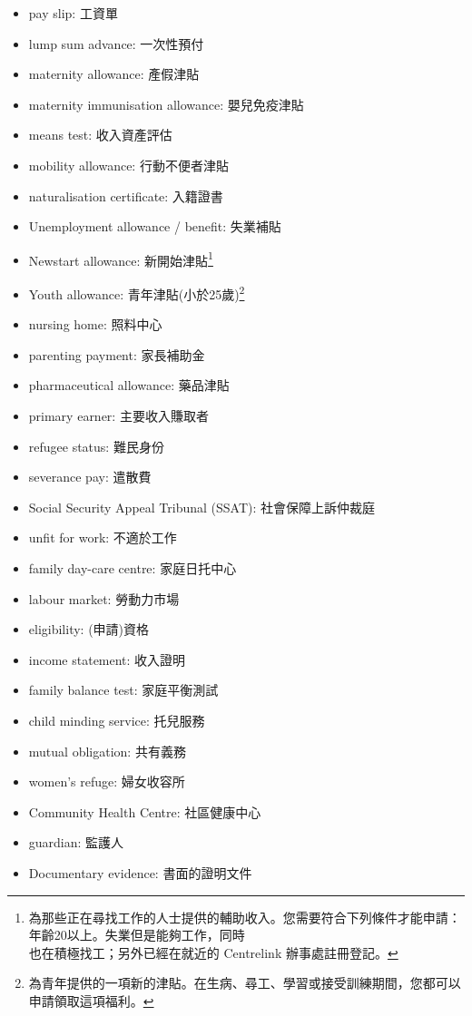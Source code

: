 \begin{multicols}{2}
\begin{itemize}
  \item pay slip: 工資單
  \item lump sum advance: 一次性預付
  \item maternity allowance: 產假津貼
  \item maternity immunisation allowance: 嬰兒免疫津貼
  \item means test: 收入資產評估
  \item mobility allowance: 行動不便者津貼
  \item naturalisation certificate: 入籍證書
  \item Unemployment allowance / benefit: 失業補貼
  \item Newstart allowance: 新開始津貼\footnote{為那些正在尋找工作的人士提供的輔助收入。您需要符合下列條件才能申請：年齡20以上。失業但是能夠工作，同時\\也在積極找工；另外已經在就近的 Centrelink 辦事處註冊登記。}
  \item Youth allowance: 青年津貼(小於25歲)\footnote{為青年提供的一項新的津貼。在生病、尋工、學習或接受訓練期間，您都可以申請領取這項福利。}
  \item nursing home: 照料中心
  \item parenting payment: 家長補助金
  \item pharmaceutical allowance: 藥品津貼
  \item primary earner: 主要收入賺取者
  \item refugee status: 難民身份
  \item severance pay: 遣散費
  \item Social Security Appeal Tribunal (SSAT): 社會保障上訴仲裁庭
  \item unfit for work: 不適於工作
  \item family day-care centre: 家庭日托中心
  \item labour market: 勞動力市場
  \item eligibility: (申請)資格
  \item income statement: 收入證明
  \item family balance test: 家庭平衡測試
  \item child minding service: 托兒服務
  \item mutual obligation: 共有義務
  \item women's refuge: 婦女收容所
  \item Community Health Centre: 社區健康中心
  \item guardian: 監護人
  \item Documentary evidence: 書面的證明文件

\end{itemize}
\end{multicols}

